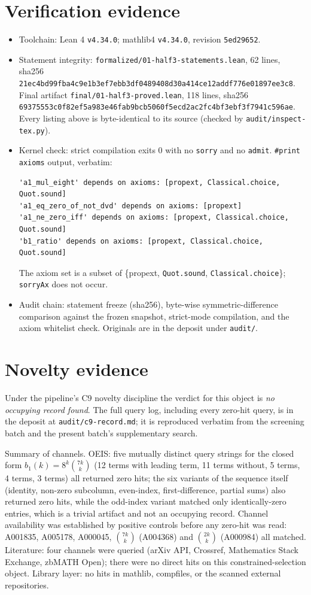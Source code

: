 \documentclass[11pt]{article}
\begin{document}
\section{Verification evidence}
\label{sec:verif}
\begin{itemize}
\item Toolchain: Lean 4 \texttt{v4.34.0}; mathlib4 \texttt{v4.34.0}, revision \texttt{5ed29652}.
\item Statement integrity: \texttt{formalized/01-half3-statements.lean}, 62 lines,
sha256 \texttt{21ec4bd99fba4c9e1b3ef7ebb3df0489408d30a414ce12addf776e01897ee3c8}.
Final artifact \texttt{final/01-half3-proved.lean}, 118 lines,
sha256 \texttt{69375553c0f82ef5a983e46fab9bcb5060f5ecd2ac2fc4bf3ebf3f7941c596ae}.
Every listing above is byte-identical to its source (checked by \texttt{audit/inspect-tex.py}).
\item Kernel check: strict compilation exits 0 with no \texttt{sorry} and no \texttt{admit}.
\texttt{\#print axioms} output, verbatim:
\begin{verbatim}
'a1_mul_eight' depends on axioms: [propext, Classical.choice, Quot.sound]
'a1_eq_zero_of_not_dvd' depends on axioms: [propext]
'a1_ne_zero_iff' depends on axioms: [propext, Classical.choice, Quot.sound]
'b1_ratio' depends on axioms: [propext, Classical.choice, Quot.sound]
\end{verbatim}
The axiom set is a subset of \{propext, \texttt{Quot.sound}, \texttt{Classical.choice}\};
\texttt{sorryAx} does not occur.
\item Audit chain: statement freeze (sha256), byte-wise symmetric-difference comparison against
the frozen snapshot, strict-mode compilation, and the axiom whitelist check. Originals are in
the deposit under \texttt{audit/}.
\end{itemize}

\section{Novelty evidence}
Under the pipeline's C9 novelty discipline the verdict for this object is \emph{no occupying
record found}. The full query log, including every zero-hit query, is in the deposit at
\texttt{audit/c9-record.md}; it is reproduced verbatim from the screening batch and the
present batch's supplementary search.

Summary of channels. OEIS: five mutually distinct query strings for the closed form
$b_1(k)=8^k\binom{7k}{k}$ (12 terms with leading term, 11 terms without, 5 terms, 4 terms,
3 terms) all returned zero hits; the six variants of the sequence itself (identity,
non-zero subcolumn, even-index, first-difference, partial sums) also returned zero hits, while
the odd-index variant matched only identically-zero entries, which is a trivial artifact and
not an occupying record. Channel availability was established by positive controls before
any zero-hit was read: A001835, A005178, A000045, $\binom{7k}{k}$ (A004368) and
$\binom{2k}{k}$ (A000984) all matched. Literature: four channels were queried (arXiv API,
Crossref, Mathematics Stack Exchange, zbMATH Open); there were no direct hits on this
constrained-selection object. Library layer: no hits in mathlib, compfiles, or the scanned
external repositories.
\end{document}
